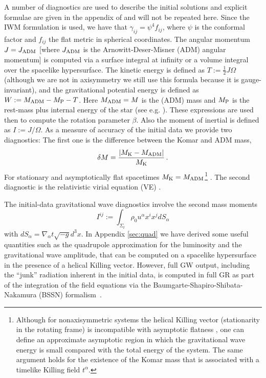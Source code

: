 \documentclass[twocolumn,superscriptaddress,showpacs,prd,aps,amsmath,amssymb,nofootinbib]{revtex4-1}
\newcommand{\GA}{\alpha}
\newcommand{\GG}{\gamma}
\newcommand{\GD}{\delta}
\newcommand{\GR}{\rho}
\newcommand{\GC}{\psi}
\newcommand{\be}{\begin{equation}}
\newcommand{\ee}{\end{equation}}
\begin{document}
A number of diagnostics are used to describe the initial solutions and
explicit formulae are given in the appendix of \cite{UTGHSTY2016} and
will not be repeated here.  Since the IWM formulation is used, we have
that $\GG_{ij}=\GC^4 f_{ij}$, where $\GC$ is the conformal factor and
$f_{ij}$ the flat metric in spherical coordinates. The angular
momentum $J=J_{\rm ADM}$ [where $J_{\rm ADM}$ is the
  Arnowitt-Deser-Misner (ADM) angular momentum] is computed via a
surface integral at infinity or a volume integral over the spacelike
hypersurface. The kinetic energy is defined as $T:=\frac{1}{2}J\Omega$
(although we are not in axisymmetry we still use this formula because
it is gauge-invariant), and the gravitational potential energy is
defined as $W:=M_{\rm ADM}-M_{\rm P}-T$. Here $M_{\rm ADM}=M$ is the
(ADM) mass and $M_{\rm P}$ is the rest-mass plus internal energy of
the star (see e.g. \cite{BS10}).  These expressions are used then to
compute the rotation parameter $\beta$. Also the moment of inertial is
defined as $I:=J/\Omega$. As a measure of accuracy of the initial data
we provide two diagnostics: The first one is the difference between
the Komar and ADM mass,
%
\be \GD M = \frac{|M_{\rm K}-M_{\rm ADM}|}{M_{\rm K}} \,.
\label{eq:KmADM}
\ee
%
For stationary and asymptotically flat spacetimes $M_{\rm K}=M_{\rm
  ADM}$\footnote{Although for nonaxisymmetric systems the helical
  Killing vector (stationarity in the rotating frame) is incompatible
  with asymptotic flatness \cite{GS84}, one can define an approximate
  asymptotic region in which the gravitational wave energy is small
  compared with the total energy of the system. The same argument
  holds for the existence of the Komar mass that is associated with a
  timelike Killing field $t^\GA$.} \cite{Beig78}. The second
diagnostic is the relativistic virial equation (VE) \cite{GB94}.

The initial-data gravitational wave diagnostics involve the second
mass moments
%
\be I^{ij}:=\int_{\Sigma_t} \GR_0 u^\GA x^i
x^j dS_\GA
\label{eq:mij}
\ee
%
with $dS_\GA=\nabla_\GA t \sqrt{-g}d^3x$. In Appendix \ref{sec:quad}
we have derived some useful quantities such as the quadrupole
approximation for the luminosity and the gravitational wave amplitude,
that can be computed on a spacelike hypersurface in the presence of a
helical Killing vector. However, full GW output, including the
``junk'' radiation inherent in the initial data, is computed in full
GR as part of the integration of the field equations via the
Baumgarte-Shapiro-Shibata-Nakamura (BSSN) formalism~\cite{SN95,BS98}.
\end{document}
